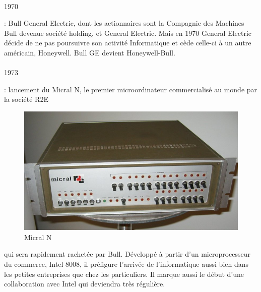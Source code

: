 \documentclass[11pt]{article}
\begin{document}
		\paragraph{}
		\begin{bf}1970\end{bf}: Bull General Electric, dont les actionnaires sont la Compagnie des Machines Bull devenue 
		société holding, et General Electric. Mais en 1970 General Electric décide de ne pas poursuivre son activité 
		Informatique et cède celle-ci à un autre américain, Honeywell. Bull GE devient Honeywell-Bull.
		\newline{}
		\newline{}
		\paragraph{}
		\begin{bf}1973\end{bf}: lancement du Micral N, le premier microordinateur commercialisé au monde par la société R2E
		\begin{figure}
		\includegraphics[scale=0.1]{micral_n.jpg}
		\caption{Micral N}
		\end{figure} 
		qui sera rapidement rachetée par Bull. Développé à partir d’un microprocesseur du commerce, Intel 8008, il préfigure 
		l’arrivée de l’informatique aussi bien dans les petites entreprises que chez les particuliers. Il marque aussi le 
		début d’une collaboration avec Intel qui deviendra très régulière.
		\newline{}
		\newline{}
		\newline{}
\end{document}
